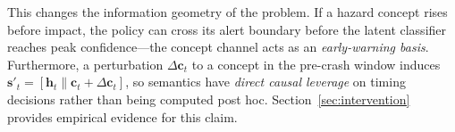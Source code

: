 This changes the information geometry of the problem. If a hazard concept rises
before impact, the policy can cross its alert boundary before the latent
classifier reaches peak confidence---the concept channel acts as an
\emph{early-warning basis}. Furthermore, a perturbation
$\Delta\mathbf{c}_t$ to a concept in the pre-crash window induces
$\mathbf{s}'_t=[\mathbf{h}_t\|\mathbf{c}_t+\Delta\mathbf{c}_t]$, so
semantics have \emph{direct causal leverage} on timing decisions rather than
being computed post hoc. Section~\ref{sec:intervention} provides empirical
evidence for this claim.
